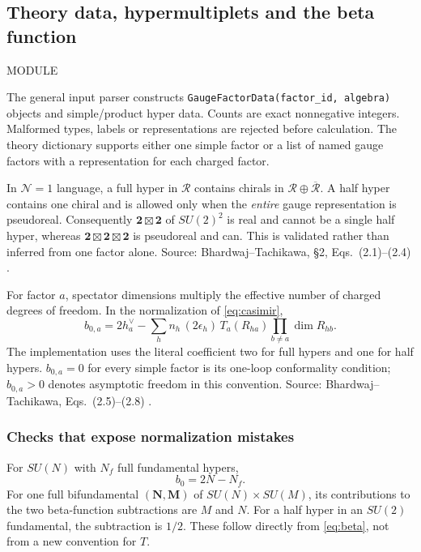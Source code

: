 \documentclass[11pt,a4paper]{article}
\numberwithin{equation}{section}
\newcommand{\code}[1]{{\small\nolinkurl{#1}}}
\newcommand{\file}[1]{\par{\small\sffamily\color{muted}MODULE \quad\texttt{\detokenize{#1}}}\par}
\newcommand{\src}[1]{{\small\color{muted}Source: #1.}\par}
\begin{document}
\clearpage
\subsection{Theory data, hypermultiplets and the beta function}
\file{anomalies/check_n2_anomalies.py}
The general input parser constructs \code{GaugeFactorData(factor_id, algebra)}
objects and simple/product hyper data. Counts are exact nonnegative integers.
Malformed types, labels or representations are rejected before calculation.
The theory dictionary supports either one simple factor or a list of named gauge
factors with a representation for each charged factor.

In $\mathcal N=1$ language, a full hyper in $\mathcal R$ contains chirals in
$\mathcal R\oplus\overline{\mathcal R}$. A half hyper contains one chiral and is
allowed only when the \emph{entire} gauge representation is pseudoreal.
Consequently $\mathbf2\boxtimes\mathbf2$ of $SU(2)^2$ is real and cannot be
a single half hyper, whereas $\mathbf2\boxtimes\mathbf2\boxtimes\mathbf2$ is
pseudoreal and can. This is validated rather than inferred from one factor alone.
\src{Bhardwaj--Tachikawa, \S2, Eqs.~(2.1)--(2.4) \cite{bt}}

For factor $a$, spectator dimensions multiply the effective number of charged
degrees of freedom. In the normalization of \eqref{eq:casimir},
\begin{equation}
 b_{0,a}=2h_a^\vee-
 \sum_h n_h\,(2\epsilon_h)\,T_a(R_{ha})
 \prod_{b\ne a}\dim R_{hb}.
 \label{eq:beta}
\end{equation}
The implementation uses the literal coefficient two for full hypers and one for
half hypers. $b_{0,a}=0$ for every simple factor is its one-loop conformality
condition; $b_{0,a}>0$ denotes asymptotic freedom in this convention.
\src{Bhardwaj--Tachikawa, Eqs.~(2.5)--(2.8) \cite{bt}}

\subsubsection{Checks that expose normalization mistakes}
For $SU(N)$ with $N_f$ full fundamental hypers,
\begin{equation}
 b_0=2N-N_f.
 \label{eq:sqcd-beta}
\end{equation}
For one full bifundamental $(\mathbf N,\mathbf M)$ of $SU(N)\times SU(M)$,
its contributions to the two beta-function subtractions are $M$ and $N$.
For a half hyper in an $SU(2)$ fundamental, the subtraction is $1/2$.
These follow directly from \eqref{eq:beta}, not from a new convention for $T$.
\end{document}
